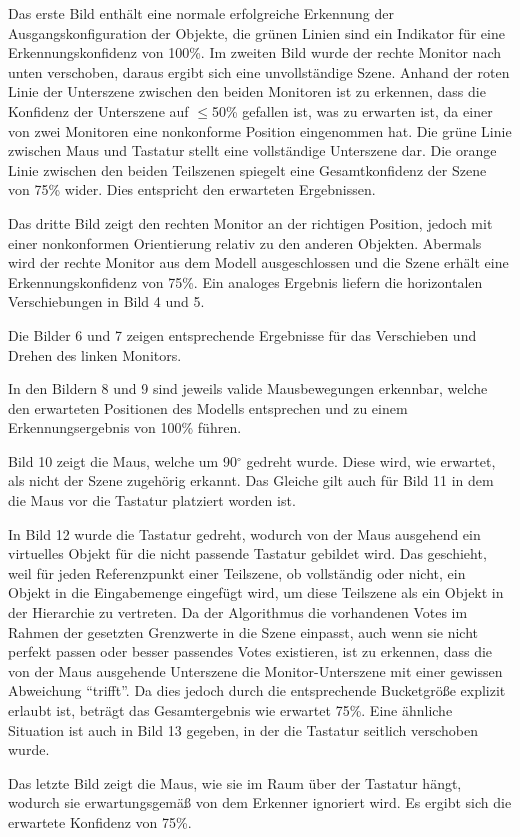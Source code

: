 Das erste Bild enthält eine normale erfolgreiche Erkennung der Ausgangskonfiguration der Objekte, die grünen Linien sind ein Indikator für eine Erkennungskonfidenz von 100\%.
Im zweiten Bild wurde der rechte Monitor nach unten verschoben, daraus ergibt sich eine unvollständige Szene.
Anhand der roten Linie der Unterszene zwischen den beiden Monitoren ist zu erkennen, dass die Konfidenz der Unterszene auf $\leq$50\% gefallen ist, was zu erwarten ist, da einer von zwei Monitoren eine nonkonforme Position eingenommen hat.
Die grüne Linie zwischen Maus und Tastatur stellt eine vollständige Unterszene dar.
Die orange Linie zwischen den beiden Teilszenen spiegelt eine Gesamtkonfidenz der Szene von 75\% wider.
Dies entspricht den erwarteten Ergebnissen.

Das dritte Bild zeigt den rechten Monitor an der richtigen Position, jedoch mit einer nonkonformen Orientierung relativ zu den anderen Objekten.
Abermals wird der rechte Monitor aus dem Modell ausgeschlossen und die Szene erhält eine Erkennungskonfidenz von 75\%.
Ein analoges Ergebnis liefern die horizontalen Verschiebungen in Bild 4 und 5.

Die Bilder 6 und 7 zeigen entsprechende Ergebnisse für das Verschieben und Drehen des linken Monitors.

In den Bildern 8 und 9 sind jeweils valide Mausbewegungen erkennbar, welche den erwarteten Positionen des Modells entsprechen und zu einem Erkennungsergebnis von 100\% führen.

Bild 10 zeigt die Maus, welche um 90$^\circ$ gedreht wurde.
Diese wird, wie erwartet, als nicht der Szene zugehörig erkannt.
Das Gleiche gilt auch für Bild 11 in dem die Maus vor die Tastatur platziert worden ist.

In Bild 12 wurde die Tastatur gedreht, wodurch von der Maus ausgehend ein virtuelles Objekt für die nicht passende Tastatur gebildet wird.
Das geschieht, weil für jeden Referenzpunkt einer Teilszene, ob vollständig oder nicht, ein Objekt in die Eingabemenge eingefügt wird, um diese Teilszene als ein Objekt in der Hierarchie zu vertreten.
Da der Algorithmus die vorhandenen Votes im Rahmen der gesetzten Grenzwerte in die Szene einpasst, auch wenn sie nicht perfekt passen oder besser passendes Votes existieren, ist zu erkennen, dass die von der Maus ausgehende Unterszene die Monitor-Unterszene mit einer gewissen Abweichung "`trifft"'.
Da dies jedoch durch die entsprechende Bucketgröße explizit erlaubt ist, beträgt das Gesamtergebnis wie erwartet 75\%.
Eine ähnliche Situation ist auch in Bild 13 gegeben, in der die Tastatur seitlich verschoben wurde.

Das letzte Bild zeigt die Maus, wie sie im Raum über der Tastatur hängt, wodurch sie erwartungsgemäß von dem Erkenner ignoriert wird.
Es ergibt sich die erwartete Konfidenz von 75\%.
